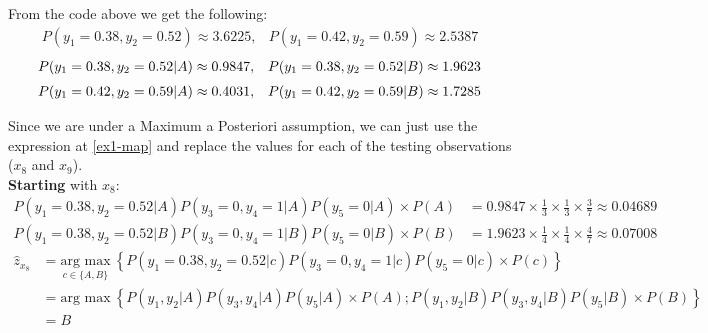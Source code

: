 \documentclass[12pt]{article}
\begin{document}
\begin{enumerate}[leftmargin=\labelsep]
\begin{enumerate}
          From the code above we get the following:
          \[
              \begin{array}{cc}
                  P(y_1 = 0.38, y_2 = 0.52) \approx 3.6225, &
                  P(y_1 = 0.42, y_2 = 0.59) \approx 2.5387
              \end{array}
          \]
          \[
              \begin{array}{cc}
                  P(y_1 = 0.38, y_2 = 0.52 | A) \approx 0.9847, &
                  P(y_1 = 0.38, y_2 = 0.52 | B) \approx 1.9623     \\[\medskipamount]
                  P(y_1 = 0.42, y_2 = 0.59 | A) \approx 0.4031, &
                  P(y_1 = 0.42, y_2 = 0.59 | B) \approx 1.7285
              \end{array}
          \]

          Since we are under a Maximum a Posteriori assumption, we can just use the expression at \eqref{ex1-map}
          and replace the values for each of the testing observations ($x_8$ and $x_9$).\\
          \textbf{Starting} with $x_8$:
          $$
              \begin{aligned}
                  P(y_1 = 0.38, y_2 = 0.52 | A) P(y_3 = 0, y_4 = 1 | A) P(y_5 = 0 | A) \times P(A) & = 0.9847 \times \frac{1}{3} \times \frac{1}{3} \times \frac{3}{7} \approx 0.04689 \\
                  P(y_1 = 0.38, y_2 = 0.52 | B) P(y_3 = 0, y_4 = 1 | B) P(y_5 = 0 | B) \times P(B) & = 1.9623 \times \frac{1}{4} \times \frac{1}{4} \times \frac{4}{7} \approx 0.07008
              \end{aligned}
          $$
          $$
              \begin{aligned}
                  \hat{z}_{x_8} & = \underset{c \in \{A, B\}}{\text{arg max}} \medspace \left\{P(y_1 = 0.38, y_2 = 0.52 | c) P(y_3 = 0, y_4 = 1 | c) P(y_5 = 0 | c) \times P(c)\right\}  \\
                          & = \text{arg max} \medspace \left\{P(y_1, y_2 | A) P(y_3, y_4 | A) P(y_5 | A) \times P(A); P(y_1, y_2 | B) P(y_3, y_4 | B) P(y_5 | B) \times P(B)\right\} \\
                          & = B
              \end{aligned}
          $$


\end{enumerate}
\end{enumerate}
\end{document}

